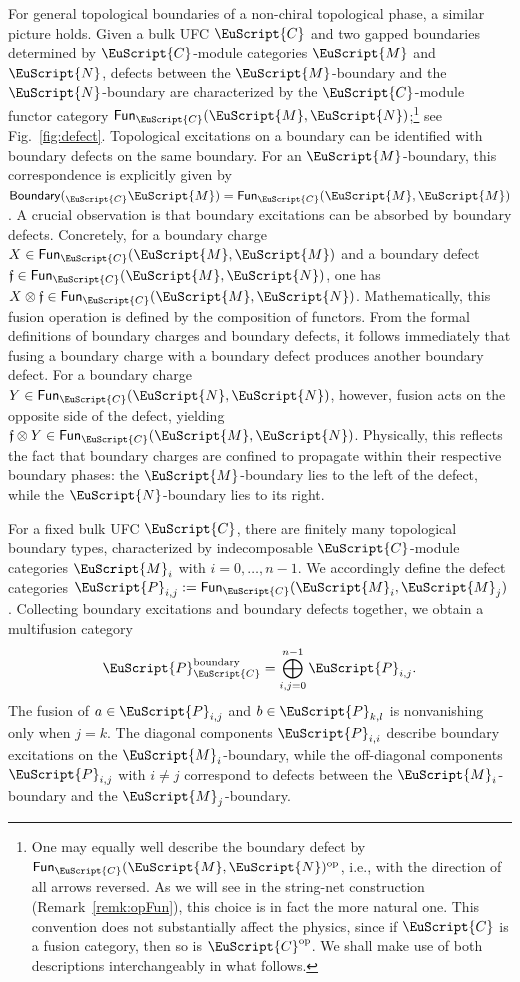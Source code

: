 \documentclass[a4paper,11pt]{article}
\theoremstyle{definition}
\theoremstyle{remark}
\newcommand\eC           {\EuScript{C}}
\newcommand\eM          {\EuScript{M}}
\newcommand\eN         {\EuScript{N}}
\newcommand\eP         {\EuScript{P}}
\newcommand{\Fun}{\mathsf{Fun}}
\newcommand{\ff}{\mathfrak{f}}
\begin{document}
For general topological boundaries of a non-chiral topological phase, a similar picture holds.
Given a bulk UFC $\eC$ and two gapped boundaries determined by $\eC$-module categories $\eM$ and $\eN$, defects between the $\eM$-boundary and the $\eN$-boundary are characterized by the $\eC$-module functor category $\Fun_{\eC}(\eM,\eN)$;\footnote{One may equally well describe the boundary defect by $\Fun_{\eC}(\eM,\eN)^{\rm op}$, i.e., with the direction of all arrows reversed. As we will see in the string-net construction (Remark~\ref{remk:opFun}), this choice is in fact the more natural one. This convention does not substantially affect the physics, since if $\eC$ is a fusion category, then so is $\eC^{\rm op}$. We shall make use of both descriptions interchangeably in what follows.} see Fig.~\ref{fig:defect}. 
Topological excitations on a boundary can be identified with boundary defects on the same boundary. For an $\eM$-boundary, this correspondence is explicitly given by $\mathsf{Boundary}({_{\eC}}\eM) = \Fun_{\eC}(\eM,\eM)$.
A crucial observation is that boundary excitations can be absorbed by boundary defects. Concretely, for a boundary charge $X \in \Fun_{\eC}(\eM,\eM)$ and a boundary defect $\ff \in \Fun_{\eC}(\eM,\eN)$, one has $X \otimes \ff \in \Fun_{\eC}(\eM,\eN)$.
Mathematically, this fusion operation is defined by the composition of functors. From the formal definitions of boundary charges and boundary defects, it follows immediately that fusing a boundary charge with a boundary defect produces another boundary defect.
For a boundary charge $Y \in \Fun_{\eC}(\eN,\eN)$, however, fusion acts on the opposite side of the defect, yielding $\ff \otimes Y \in \Fun_{\eC}(\eM,\eN)$.
Physically, this reflects the fact that boundary charges are confined to propagate within their respective boundary phases: the $\eM$-boundary lies to the left of the defect, while the $\eN$-boundary lies to its right.

For a fixed bulk UFC $\eC$, there are finitely many topological boundary types, characterized by indecomposable $\eC$-module categories $\eM_i$ with $i = 0, \ldots, n-1$.
We accordingly define the defect categories $\eP_{i,j} := \Fun_{\eC}(\eM_i,\eM_j)$.
Collecting boundary excitations and boundary defects together, we obtain a multifusion category
\begin{equation}
    \eP^{\rm boundary}_{\eC} = \bigoplus_{i,j=0}^{n-1} \eP_{i,j}.
\end{equation}
The fusion of $a \in \eP_{i,j}$ and $b \in \eP_{k,l}$ is nonvanishing only when $j = k$.
The diagonal components $\eP_{i,i}$ describe boundary excitations on the $\eM_i$-boundary, while the off-diagonal components $\eP_{i,j}$ with $i \neq j$ correspond to defects between the $\eM_i$-boundary and the $\eM_j$-boundary.
\end{document}
